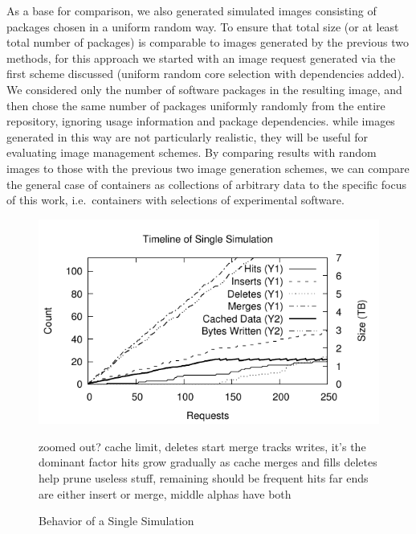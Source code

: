 \documentclass[sigconf]{acmart}
\begin{document}
As a base for comparison,
we also generated simulated images consisting of packages chosen in a uniform random way.
To ensure that total size (or at least total number of packages)
is comparable to images generated by the previous two methods,
for this approach we started with an image request generated via the first scheme discussed
(uniform random core selection with dependencies added).
We considered only the number of software packages in the resulting image,
and then chose the same number of packages uniformly randomly from the entire repository,
ignoring usage information and package dependencies.
while images generated in this way are not particularly realistic,
they will be useful for evaluating image management schemes.
By comparing results with random images to those with the previous two image generation schemes,
we can compare the general case of containers as collections of arbitrary data to the specific focus of this work,
i.e.\ containers with selections of experimental software.   

\begin{figure}
\includegraphics[width=\linewidth]{curated/time-series/time-series.pdf}
\caption{Behavior of a Single Simulation}
\label{fig:series}
zoomed out?
cache limit, deletes start
merge tracks writes, it's the dominant factor
hits grow gradually as cache merges and fills
deletes help prune useless stuff, remaining should be frequent hits
far ends are either insert or merge, middle alphas have both
\fi
\end{figure}
    
\end{document}
